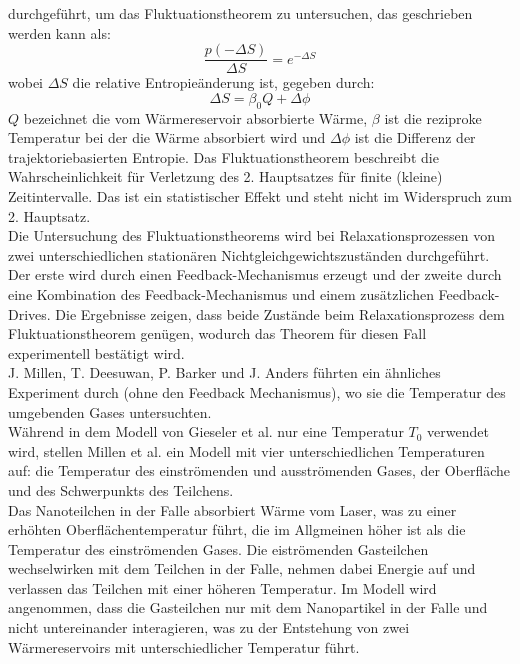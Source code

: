 \documentclass[12pt]{article}
\begin{document}
durchgeführt, um das Fluktuationstheorem zu untersuchen, das geschrieben werden kann als:
\begin{equation}
    \label{eq:fluctuationtheorem}
    \frac{p(-\Delta S)}{\Delta S} = e^{-\Delta S}
\end{equation}
wobei $\Delta S$ die relative Entropieänderung ist, gegeben durch:
\begin{equation}
    \Delta S = \beta_0 Q + \Delta \phi
\end{equation}
$Q$ bezeichnet die vom Wärmereservoir absorbierte Wärme, $\beta$ ist die reziproke Temperatur bei der die Wärme absorbiert wird
und $\Delta \phi$ ist die Differenz der trajektoriebasierten Entropie. Das Fluktuationstheorem beschreibt die 
Wahrscheinlichkeit für Verletzung des 2. Hauptsatzes für finite (kleine) Zeitintervalle. Das ist ein statistischer Effekt und steht nicht
im Widerspruch zum 2. Hauptsatz.\\
Die Untersuchung des Fluktuationstheorems wird bei Relaxationsprozessen von zwei unterschiedlichen stationären Nichtgleichgewichtszuständen
durchgeführt. Der erste wird durch einen Feedback-Mechanismus erzeugt und der zweite durch eine Kombination des Feedback-Mechanismus und einem
zusätzlichen Feedback-Drives. Die Ergebnisse zeigen, dass beide Zustände beim Relaxationsprozess dem Fluktuationstheorem genügen, wodurch 
das Theorem für diesen Fall experimentell bestätigt wird.\\
J. Millen, T. Deesuwan, P. Barker und J. Anders führten ein ähnliches Experiment durch (ohne den Feedback Mechanismus), wo sie die Temperatur
des umgebenden Gases untersuchten.\\
Während in dem Modell von Gieseler et al. nur eine Temperatur $T_0$ verwendet wird, stellen Millen et al. ein Modell mit vier unterschiedlichen
Temperaturen auf: die Temperatur des einströmenden und ausströmenden Gases, der Oberfläche und des Schwerpunkts des Teilchens.\\
Das Nanoteilchen in der Falle absorbiert Wärme vom Laser, was zu einer erhöhten Oberflächentemperatur führt, die im Allgmeinen höher ist 
als die Temperatur des einströmenden Gases. Die eiströmenden Gasteilchen wechselwirken mit dem Teilchen in der Falle, nehmen dabei Energie 
auf und verlassen das Teilchen mit einer höheren Temperatur. Im Modell wird angenommen, dass die Gasteilchen nur mit dem Nanopartikel in der
Falle und nicht untereinander interagieren, was zu der Entstehung von zwei Wärmereservoirs mit unterschiedlicher Temperatur führt.\\
\end{document}
